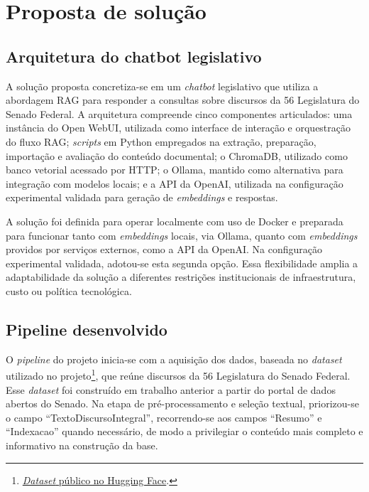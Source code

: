 \section{Proposta de solução}

\subsection{Arquitetura do chatbot legislativo}

A solução proposta concretiza-se em um \textit{chatbot} legislativo que utiliza a abordagem RAG para responder a consultas sobre discursos da 56\textordfeminine{} Legislatura do Senado Federal. A arquitetura compreende cinco componentes articulados: uma instância do Open WebUI, utilizada como interface de interação e orquestração do fluxo RAG; \textit{scripts} em Python empregados na extração, preparação, importação e avaliação do conteúdo documental; o ChromaDB, utilizado como banco vetorial acessado por HTTP; o Ollama, mantido como alternativa para integração com modelos locais; e a API da OpenAI, utilizada na configuração experimental validada para geração de \textit{embeddings} e respostas.

A solução foi definida para operar localmente com uso de Docker e preparada para funcionar tanto com \textit{embeddings} locais, via Ollama, quanto com \textit{embeddings} providos por serviços externos, como a API da OpenAI. Na configuração experimental validada, adotou-se esta segunda opção. Essa flexibilidade amplia a adaptabilidade da solução a diferentes restrições institucionais de infraestrutura, custo ou política tecnológica.

\subsection{Pipeline desenvolvido}

O \textit{pipeline} do projeto inicia-se com a aquisição dos dados, baseada no \textit{dataset} utilizado no projeto\footnote{\href{https://huggingface.co/datasets/fabriciosantana/discursos-senado-legislatura-56}{\textit{Dataset} público no Hugging Face}.}, que reúne discursos da 56\textordfeminine{} Legislatura do Senado Federal. Esse \textit{dataset} foi construído em trabalho anterior a partir do portal de dados abertos do Senado. Na etapa de pré-processamento e seleção textual, priorizou-se o campo ``TextoDiscursoIntegral'', recorrendo-se aos campos ``Resumo'' e ``Indexacao'' quando necessário, de modo a privilegiar o conteúdo mais completo e informativo na construção da base.

